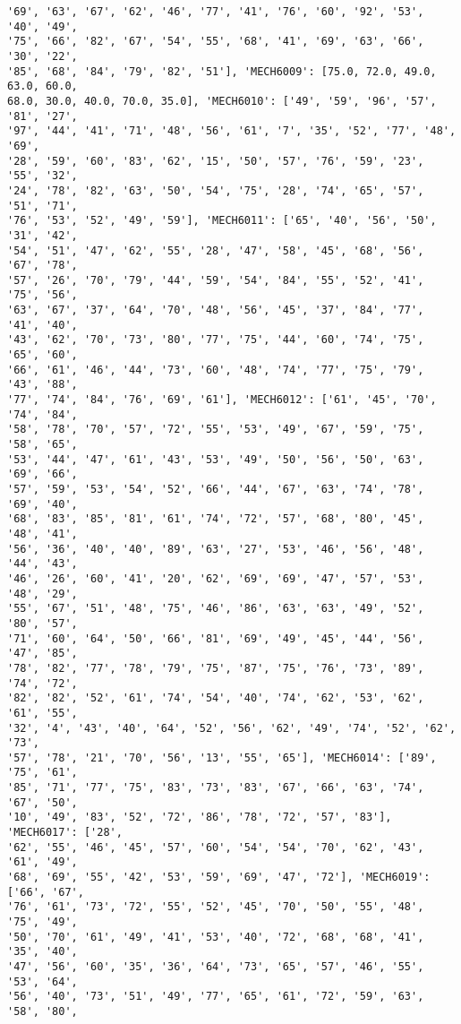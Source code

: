 \documentclass[11pt]{article}
\begin{document}
\begin{Verbatim}[commandchars=\\\{\}]
'69', '63', '67', '62', '46', '77', '41', '76', '60', '92', '53', '40', '49',
'75', '66', '82', '67', '54', '55', '68', '41', '69', '63', '66', '30', '22',
'85', '68', '84', '79', '82', '51'], 'MECH6009': [75.0, 72.0, 49.0, 63.0, 60.0,
68.0, 30.0, 40.0, 70.0, 35.0], 'MECH6010': ['49', '59', '96', '57', '81', '27',
'97', '44', '41', '71', '48', '56', '61', '7', '35', '52', '77', '48', '69',
'28', '59', '60', '83', '62', '15', '50', '57', '76', '59', '23', '55', '32',
'24', '78', '82', '63', '50', '54', '75', '28', '74', '65', '57', '51', '71',
'76', '53', '52', '49', '59'], 'MECH6011': ['65', '40', '56', '50', '31', '42',
'54', '51', '47', '62', '55', '28', '47', '58', '45', '68', '56', '67', '78',
'57', '26', '70', '79', '44', '59', '54', '84', '55', '52', '41', '75', '56',
'63', '67', '37', '64', '70', '48', '56', '45', '37', '84', '77', '41', '40',
'43', '62', '70', '73', '80', '77', '75', '44', '60', '74', '75', '65', '60',
'66', '61', '46', '44', '73', '60', '48', '74', '77', '75', '79', '43', '88',
'77', '74', '84', '76', '69', '61'], 'MECH6012': ['61', '45', '70', '74', '84',
'58', '78', '70', '57', '72', '55', '53', '49', '67', '59', '75', '58', '65',
'53', '44', '47', '61', '43', '53', '49', '50', '56', '50', '63', '69', '66',
'57', '59', '53', '54', '52', '66', '44', '67', '63', '74', '78', '69', '40',
'68', '83', '85', '81', '61', '74', '72', '57', '68', '80', '45', '48', '41',
'56', '36', '40', '40', '89', '63', '27', '53', '46', '56', '48', '44', '43',
'46', '26', '60', '41', '20', '62', '69', '69', '47', '57', '53', '48', '29',
'55', '67', '51', '48', '75', '46', '86', '63', '63', '49', '52', '80', '57',
'71', '60', '64', '50', '66', '81', '69', '49', '45', '44', '56', '47', '85',
'78', '82', '77', '78', '79', '75', '87', '75', '76', '73', '89', '74', '72',
'82', '82', '52', '61', '74', '54', '40', '74', '62', '53', '62', '61', '55',
'32', '4', '43', '40', '64', '52', '56', '62', '49', '74', '52', '62', '73',
'57', '78', '21', '70', '56', '13', '55', '65'], 'MECH6014': ['89', '75', '61',
'85', '71', '77', '75', '83', '73', '83', '67', '66', '63', '74', '67', '50',
'10', '49', '83', '52', '72', '86', '78', '72', '57', '83'], 'MECH6017': ['28',
'62', '55', '46', '45', '57', '60', '54', '54', '70', '62', '43', '61', '49',
'68', '69', '55', '42', '53', '59', '69', '47', '72'], 'MECH6019': ['66', '67',
'76', '61', '73', '72', '55', '52', '45', '70', '50', '55', '48', '75', '49',
'50', '70', '61', '49', '41', '53', '40', '72', '68', '68', '41', '35', '40',
'47', '56', '60', '35', '36', '64', '73', '65', '57', '46', '55', '53', '64',
'56', '40', '73', '51', '49', '77', '65', '61', '72', '59', '63', '58', '80',

\end{Verbatim}
\end{document}
